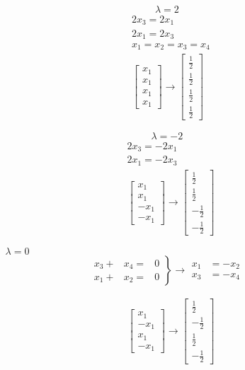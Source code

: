 \begin{example*}
\begin{enumerate}[label=\Roman*.]
\begin{itemize}
\begin{multicols}{2}
$$\lambda = 2$$
\begin{align*}
&2x_3=2x_1\\
&2x_1=2x_3\\
&x_1=x_2=x_3=x_4\\
&\begin{bmatrix}
x_1\\x_1\\x_1\\x_1
\end{bmatrix}\rightarrow
\begin{bmatrix}
\frac{1}{2}\\\frac{1}{2}\\\frac{1}{2}\\\frac{1}{2}
\end{bmatrix}
\end{align*}

$$\lambda = -2$$
\begin{align*}
&2x_3=-2x_1\\
&2x_1=-2x_3\\
&\begin{bmatrix}
x_1\\x_1\\-x_1\\-x_1
\end{bmatrix}\rightarrow
\begin{bmatrix}
\frac{1}{2}\\\frac{1}{2}\\-\frac{1}{2}\\-\frac{1}{2}
\end{bmatrix}
\end{align*}
\end{multicols}

\item[$\lambda = 0$] 
$$\left.\begin{matrix}
x_3+&x_4=&0\\
x_1+&x_2=&0
\end{matrix}\right\}\rightarrow \begin{matrix}
x_1 &= -x_2\\
x_3 &= -x_4
\end{matrix}$$

\begin{multicols}{2}
\begin{align*}
&\begin{bmatrix}
x_1\\-x_1\\x_1\\-x_1
\end{bmatrix}\rightarrow
\begin{bmatrix}
\frac{1}{2}\\-\frac{1}{2}\\\frac{1}{2}\\-\frac{1}{2}
\end{bmatrix}
\end{align*}


\end{multicols}
\end{itemize}
\end{enumerate}
\end{example*}
